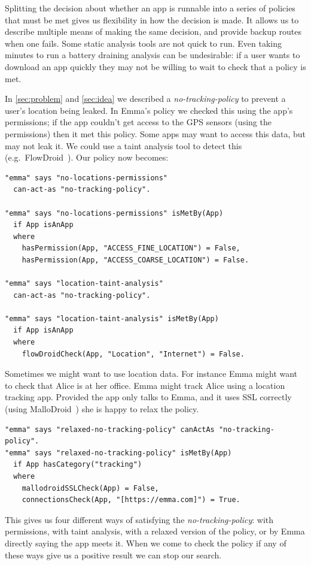 \documentclass[]{llncs}
\begin{document}
Splitting the decision about whether an app is runnable into a series of policies that must be met gives us flexibility in how the decision is made.
It allows us to describe multiple means of making the same decision, and provide backup routes when one fails.
Some static analysis tools are not quick to run.
Even taking minutes to run a battery draining analysis can be undesirable:
if a user wants to download an app quickly they may not be willing to wait to check that a policy is met.

In \autoref{sec:problem} and \autoref{sec:idea} we described a \emph{no-tracking-policy} to prevent a user's location being leaked.
In Emma's policy we checked this using the app's permissions;
if the app couldn't get access to the GPS sensors (using the permissions) then it met this policy.
Some apps may want to access this data, but may not leak it.
We could use a taint analysis tool to detect this (e.g.~FlowDroid~\cite{Fritz:2013vi}).
Our policy now becomes:

\begin{lstlisting}
"emma" says "no-locations-permissions"
  can-act-as "no-tracking-policy".

"emma" says "no-locations-permissions" isMetBy(App)
  if App isAnApp
  where
    hasPermission(App, "ACCESS_FINE_LOCATION") = False,
    hasPermission(App, "ACCESS_COARSE_LOCATION") = False.

"emma" says "location-taint-analysis"
  can-act-as "no-tracking-policy".

"emma" says "location-taint-analysis" isMetBy(App)
  if App isAnApp
  where
    flowDroidCheck(App, "Location", "Internet") = False.
\end{lstlisting}

Sometimes we might want to use location data.
For instance Emma might want to check that Alice is at her office.
Emma might track Alice using a location tracking app.
Provided the app only talks to Emma, and it uses SSL correctly (using MalloDroid~\cite{Fahl:2012dj}) she is happy to relax the policy.

\begin{lstlisting}
"emma" says "relaxed-no-tracking-policy" canActAs "no-tracking-policy".
"emma" says "relaxed-no-tracking-policy" isMetBy(App)
  if App hasCategory("tracking")
  where
    mallodroidSSLCheck(App) = False,
    connectionsCheck(App, "[https://emma.com]") = True.
\end{lstlisting}

This gives us four different ways of satisfying the \emph{no-tracking-policy}:
  with permissions,
  with taint analysis,
  with a relaxed version of the policy,
  or by Emma directly saying the app meets it.
When we come to check the policy if any of these ways give us a positive result we can stop our search.
\end{document}
